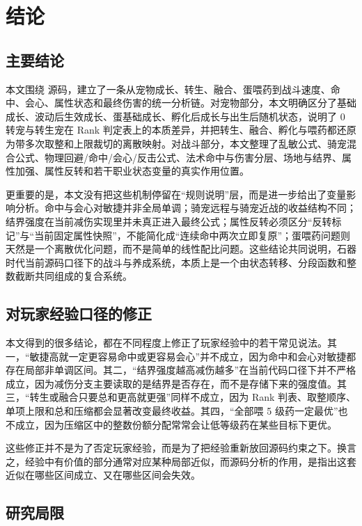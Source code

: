 \chapter{结论}

\section{主要结论}

本文围绕  源码，建立了一条从宠物成长、转生、融合、蛋喂药到战斗速度、命中、会心、属性状态和最终伤害的统一分析链。对宠物部分，本文明确区分了基础成长、波动后生效成长、蛋基础成长、孵化后成长与出生后随机状态，说明了 0 转宠与转生宠在 Rank 判定表上的本质差异，并把转生、融合、孵化与喂药都还原为带多次取整和上限裁切的离散映射。对战斗部分，本文整理了乱敏公式、骑宠混合公式、物理回避/命中/会心/反击公式、法术命中与伤害分层、场地与结界、属性加强、属性反转和若干职业状态变量的真实作用位置。

更重要的是，本文没有把这些机制停留在“规则说明”层，而是进一步给出了变量影响分析。命中与会心对敏捷并非全局单调；骑宠远程与骑宠近战的收益结构不同；结界强度在当前减伤实现里并未真正进入最终公式；属性反转必须区分“反转标记”与“当前固定属性快照”，不能简化成“连续命中两次立即复原”；蛋喂药问题则天然是一个离散优化问题，而不是简单的线性配比问题。这些结论共同说明，石器时代当前源码口径下的战斗与养成系统，本质上是一个由状态转移、分段函数和整数截断共同组成的复合系统。

\section{对玩家经验口径的修正}

本文得到的很多结论，都在不同程度上修正了玩家经验中的若干常见说法。其一，“敏捷高就一定更容易命中或更容易会心”并不成立，因为命中和会心对敏捷都存在局部非单调区间。其二，“结界强度越高减伤越多”在当前代码口径下并不严格成立，因为减伤分支主要读取的是结界是否存在，而不是存储下来的强度值。其三，“转生或融合只要总和更高就更强”同样不成立，因为 Rank 判表、取整顺序、单项上限和总和压缩都会显著改变最终收益。其四，“全部喂 5 级药一定最优”也不成立，因为压缩区中的整数份额分配常常会让低等级药在某些目标下更优。

这些修正并不是为了否定玩家经验，而是为了把经验重新放回源码约束之下。换言之，经验中有价值的部分通常对应某种局部近似，而源码分析的作用，是指出这套近似在哪些区间成立、又在哪些区间会失效。

\section{研究局限}

